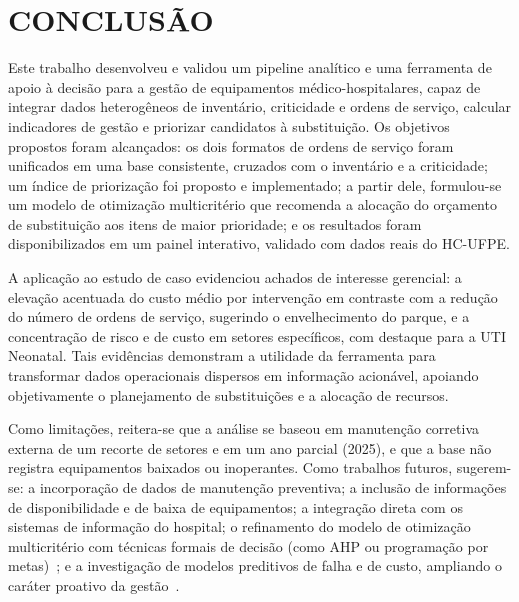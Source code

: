 \chapter{CONCLUSÃO}
\label{chapter:conclusao}

Este trabalho desenvolveu e validou um pipeline analítico e uma ferramenta de
apoio à decisão para a gestão de equipamentos médico-hospitalares, capaz de
integrar dados heterogêneos de inventário, criticidade e ordens de serviço,
calcular indicadores de gestão e priorizar candidatos à substituição. Os
objetivos propostos foram alcançados: os dois formatos de ordens de serviço foram
unificados em uma base consistente, cruzados com o inventário e a criticidade; um
índice de priorização foi proposto e implementado; a partir dele, formulou-se um
modelo de otimização multicritério que recomenda a alocação do orçamento de
substituição aos itens de maior prioridade; e os resultados foram disponibilizados
em um painel interativo, validado com dados reais do HC-UFPE.

A aplicação ao estudo de caso evidenciou achados de interesse gerencial: a
elevação acentuada do custo médio por intervenção em contraste com a redução do
número de ordens de serviço, sugerindo o envelhecimento do parque, e a
concentração de risco e de custo em setores específicos, com destaque para a UTI
Neonatal. Tais evidências demonstram a utilidade da ferramenta para transformar
dados operacionais dispersos em informação acionável, apoiando objetivamente o
planejamento de substituições e a alocação de recursos.

Como limitações, reitera-se que a análise se baseou em manutenção corretiva
externa de um recorte de setores e em um ano parcial (2025), e que a base não
registra equipamentos baixados ou inoperantes. Como trabalhos futuros, sugerem-se:
a incorporação de dados de manutenção preventiva; a inclusão de informações de
disponibilidade e de baixa de equipamentos; a integração direta com os sistemas de
informação do hospital; o refinamento do modelo de otimização multicritério com
técnicas formais de decisão (como AHP ou programação por
metas)~\cite{huang2024transforming,park2025evaluation}; e a investigação
de modelos preditivos de falha e de custo, ampliando o caráter proativo da
gestão~\cite{zamzam2021prioritisation}.
